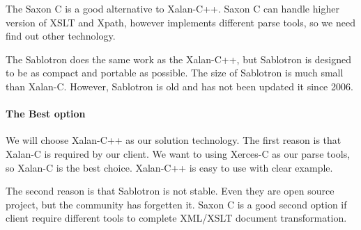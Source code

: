 The Saxon C is a good alternative to Xalan-C++.
Saxon C can handle higher version of XSLT and Xpath, however implements different parse tools, so we need find out other technology.

The Sablotron does the same work as the Xalan-C++, but Sablotron is designed to be as compact and portable as possible.
The size of Sablotron is much small than Xalan-C.
However, Sablotron is old and has not been updated it since 2006.

\paragraph{The Best option}

We will choose Xalan-C++ as our solution technology.
The first reason is that Xalan-C is required by our client.
We want to using Xerces-C as our parse tools, so Xalan-C is the best choice.
Xalan-C++ is easy to use with clear example.

The second reason is that Sablotron is not stable.
Even they are open source project, but the community has forgetten it.
Saxon C is a good second option if client require different tools to complete XML/XSLT document transformation.
